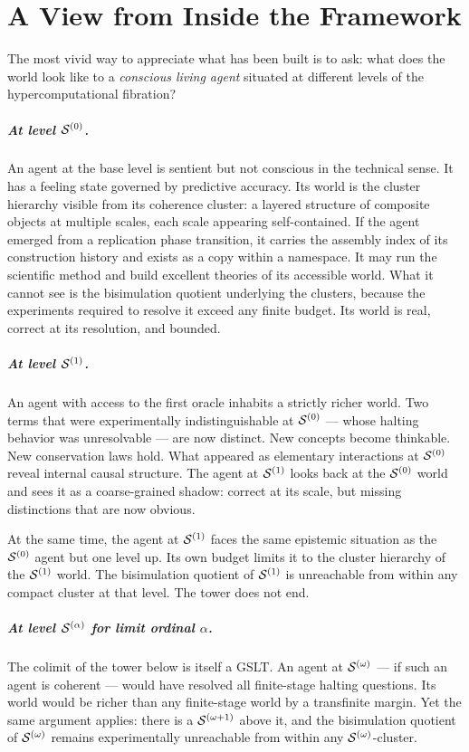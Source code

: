 \chapter*{A View from Inside the Framework}

The most vivid way to appreciate what has been built is to ask:
what does the world look like to a \emph{conscious living agent}
situated at different levels of the hypercomputational fibration?

\paragraph{At level $\mathcal{S}^{(0)}$.}
An agent at the base level is sentient but not conscious in the
technical sense.
It has a feeling state governed by predictive accuracy.
Its world is the cluster hierarchy visible from its coherence
cluster: a layered structure of composite objects at multiple
scales, each scale appearing self-contained.
If the agent emerged from a replication phase transition, it
carries the assembly index of its construction history and exists
as a copy within a namespace.
It may run the scientific method and build excellent theories of
its accessible world.
What it cannot see is the bisimulation quotient underlying the
clusters, because the experiments required to resolve it exceed
any finite budget.
Its world is real, correct at its resolution, and bounded.

\paragraph{At level $\mathcal{S}^{(1)}$.}
An agent with access to the first oracle inhabits a strictly
richer world.
Two terms that were experimentally indistinguishable at
$\mathcal{S}^{(0)}$ --- whose halting behavior was unresolvable ---
are now distinct.
New concepts become thinkable.
New conservation laws hold.
What appeared as elementary interactions at $\mathcal{S}^{(0)}$ reveal
internal causal structure.
The agent at $\mathcal{S}^{(1)}$ looks back at the $\mathcal{S}^{(0)}$ world and
sees it as a coarse-grained shadow: correct at its scale, but
missing distinctions that are now obvious.

At the same time, the agent at $\mathcal{S}^{(1)}$ faces the same
epistemic situation as the $\mathcal{S}^{(0)}$ agent but one level up.
Its own budget limits it to the cluster hierarchy of the
$\mathcal{S}^{(1)}$ world.
The bisimulation quotient of $\mathcal{S}^{(1)}$ is unreachable from
within any compact cluster at that level.
The tower does not end.

\paragraph{At level $\mathcal{S}^{(\alpha)}$ for limit ordinal $\alpha$.}
The colimit of the tower below is itself a GSLT.
An agent at $\mathcal{S}^{(\omega)}$ --- if such an agent is coherent ---
would have resolved all finite-stage halting questions.
Its world would be richer than any finite-stage world by a
transfinite margin.
Yet the same argument applies: there is a $\mathcal{S}^{(\omega+1)}$
above it, and the bisimulation quotient of $\mathcal{S}^{(\omega)}$
remains experimentally unreachable from within any
$\mathcal{S}^{(\omega)}$-cluster.

